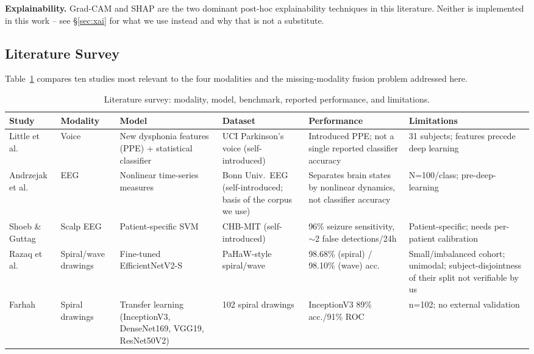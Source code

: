 \documentclass[conference]{IEEEtran}
\begin{document}
\textbf{Explainability.} Grad-CAM \cite{selvaraju2017gradcam} and SHAP
\cite{lundberg2017shap} are the two dominant post-hoc explainability
techniques in this literature. Neither is implemented in this work --
see \S\ref{sec:xai} for what we use instead and why that is not a
substitute.

\subsection{Literature Survey}

Table~\ref{tab:litsurvey} compares ten studies most relevant to the four
modalities and the missing-modality fusion problem addressed here.

\begin{table}[t]
\centering
\caption{Literature survey: modality, model, benchmark, reported performance, and limitations.}
\label{tab:litsurvey}
\small
\begin{tabular}{p{2.1cm}p{1.6cm}p{2.6cm}p{2.3cm}p{2.9cm}p{3.6cm}}
\toprule
\textbf{Study} & \textbf{Modality} & \textbf{Model} & \textbf{Dataset} & \textbf{Performance} & \textbf{Limitations} \\
\midrule
Little et al.\ \cite{little2009suitability} & Voice & New dysphonia features (PPE) + statistical classifier & UCI Parkinson's voice (self-introduced) & Introduced PPE; not a single reported classifier accuracy & 31 subjects; features precede deep learning \\
Andrzejak et al.\ \cite{andrzejak2001indications} & EEG & Nonlinear time-series measures & Bonn Univ.\ EEG (self-introduced; basis of the corpus we use) & Separates brain states by nonlinear dynamics, not classifier accuracy & N=100/class; pre-deep-learning \\
Shoeb \& Guttag \cite{shoeb2009application} & Scalp EEG & Patient-specific SVM & CHB-MIT (self-introduced) & 96\% seizure sensitivity, $\sim$2 false detections/24h & Patient-specific; needs per-patient calibration \\
Razaq et al.\ \cite{razaq2025efficientnetv2s} & Spiral/wave drawings & Fine-tuned EfficientNetV2-S & PaHaW-style spiral/wave & 98.68\% (spiral) / 98.10\% (wave) acc.\ & Small/imbalanced cohort; unimodal; subject-disjointness of their split not verifiable by us \\
Farhah \cite{farhah2024spiraldrawing} & Spiral drawings & Transfer learning (InceptionV3, DenseNet169, VGG19, ResNet50V2) & 102 spiral drawings & InceptionV3 89\% acc./91\% ROC & n=102; no external validation \\

\end{tabular}
\end{table}
\end{document}
